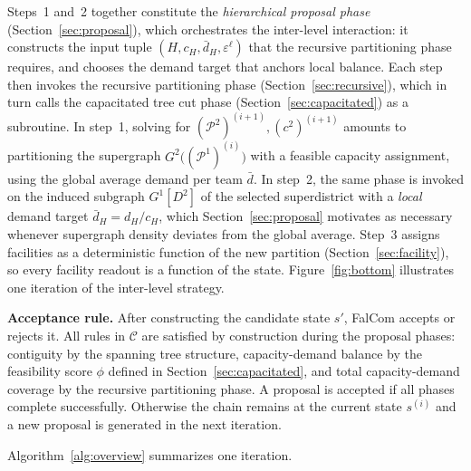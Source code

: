 \documentclass[11pt]{article}
\theoremstyle{definition}
\begin{document}
Steps~1 and~2 together constitute the \emph{hierarchical proposal phase}
(Section~\ref{sec:proposal}), which orchestrates the inter-level
interaction: it constructs the input tuple
$(H, c_H, \bar{d}_H, \varepsilon^\ell)$ that the recursive partitioning
phase requires, and chooses the demand target that anchors local
balance. Each step then invokes the recursive partitioning phase
(Section~\ref{sec:recursive}), which in turn calls the capacitated tree
cut phase (Section~\ref{sec:capacitated}) as a subroutine. In step~1,
solving for $(\mathcal{P}^2)^{(i+1)}, (c^2)^{(i+1)}$ amounts to
partitioning the supergraph $G^2\bigl((\mathcal{P}^1)^{(i)}\bigr)$ with
a feasible capacity assignment, using the global average demand per team
$\bar{d}$. In step~2, the same phase is invoked on the induced subgraph
$G^1[D^2]$ of the selected superdistrict with a \emph{local} demand
target $\bar{d}_H = d_H / c_H$, which Section~\ref{sec:proposal}
motivates as necessary whenever supergraph density deviates from the
global average. Step~3 assigns facilities as a deterministic function of the new partition (Section~\ref{sec:facility}), so every facility readout is a function of the state. Figure~\ref{fig:bottom}
illustrates one iteration of the inter-level strategy.


\medskip

\noindent\textbf{Acceptance rule.}\quad
After constructing the candidate state $s'$, FalCom accepts or rejects it.
All rules in $\mathcal{C}$ are satisfied by construction during the proposal
phases: contiguity by the spanning tree structure, capacity-demand balance
by the feasibility score $\phi$ defined in Section~\ref{sec:capacitated},
and total capacity-demand coverage by the recursive partitioning phase.
A proposal is accepted if all phases complete successfully. Otherwise the
chain remains at the current state $s^{(i)}$ and a new proposal is generated
in the next iteration.

Algorithm~\ref{alg:overview} summarizes one iteration.

\medskip
\end{document}
